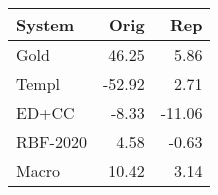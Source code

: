 \begin{tabular}{lrr}
\toprule
System & Orig & Rep \\
\midrule
Gold & 46.25 & 5.86 \\
Templ & -52.92 & 2.71 \\
ED+CC & -8.33 & -11.06 \\
RBF-2020 & 4.58 & -0.63 \\
Macro & 10.42 & 3.14 \\
\bottomrule
\end{tabular}
